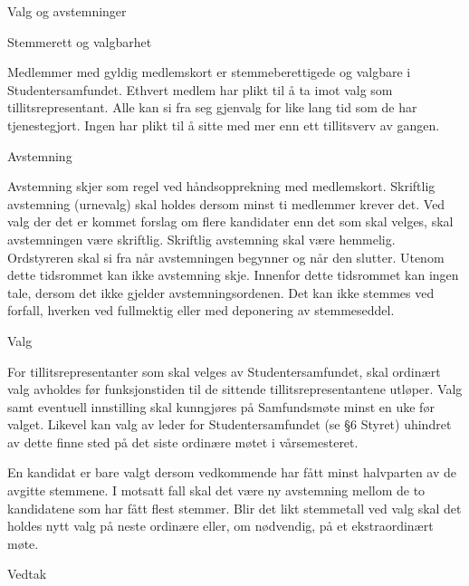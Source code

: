 \begin{lovkapittel}{Valg og avstemninger}
  
  \begin{lovparagraf}{Stemmerett og valgbarhet}

Medlemmer med gyldig medlemskort er stemmeberettigede og valgbare i Studentersamfundet. Ethvert medlem har
plikt til å ta imot valg som tillitsrepresentant. Alle kan si fra seg gjenvalg for like lang tid som de har tjenestegjort.
Ingen har plikt til å sitte med mer enn ett tillitsverv av gangen.

  \end{lovparagraf}
  
  \begin{lovparagraf}{Avstemning}
  
Avstemning skjer som regel ved håndsopprekning med medlemskort. Skriftlig avstemning (urnevalg) skal holdes
dersom minst ti medlemmer krever det. Ved valg der det er kommet forslag om flere kandidater enn det som skal
velges, skal avstemningen være skriftlig. Skriftlig avstemning skal være hemmelig. Ordstyreren skal si fra når
avstemningen begynner og når den slutter. Utenom dette tidsrommet kan ikke avstemning skje. Innenfor dette
tidsrommet kan ingen tale, dersom det ikke gjelder avstemningsordenen. Det kan ikke stemmes ved forfall, hverken
ved fullmektig eller med deponering av stemmeseddel.
  
  \end{lovparagraf}
  
  \begin{lovparagraf}{Valg}

For tillitsrepresentanter som skal velges av Studentersamfundet, skal ordinært valg avholdes før funksjonstiden til de
sittende tillitsrepresentantene utløper. Valg samt eventuell innstilling skal kunngjøres på Samfundsmøte minst en uke
før valget. Likevel kan valg av leder for Studentersamfundet (se §6 Styret) uhindret av dette finne sted på det siste
ordinære møtet i vårsemesteret.

En kandidat er bare valgt dersom vedkommende har fått minst halvparten av de avgitte stemmene. I motsatt fall skal
det være ny avstemning mellom de to kandidatene som har fått flest stemmer. Blir det likt stemmetall ved valg skal
det holdes nytt valg på neste ordinære eller, om nødvendig, på et ekstraordinært møte.
  
  \end{lovparagraf}
  
  \begin{lovparagraf}{Vedtak}
  

\end{lovparagraf}
\end{lovkapittel}
